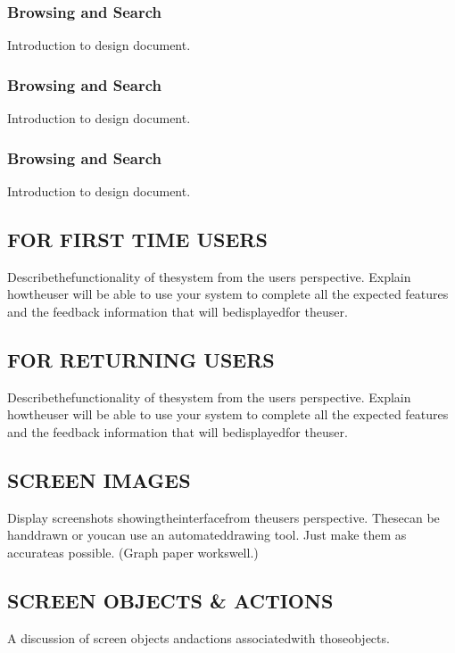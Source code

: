 \documentclass[twoside,letterpaper]{article}
\begin{document}
\subsubsection[Browsing and Search]{\rmfamily\bfseries\color{black}
Browsing and Search}
{\rmfamily\color{black}
Introduction to design document.
}

\subsubsection[Form Entry]{\rmfamily\bfseries\color{black}
Browsing and Search}
{\rmfamily\color{black}
Introduction to design document.
}

\subsubsection[Delayed Upload]{\rmfamily\bfseries\color{black}
Browsing and Search}
{\rmfamily\color{black}
Introduction to design document.
}

\subsection[FOR FIRST TIME USERS]{\rmfamily\bfseries\color{black}
FOR FIRST TIME USERS}
{\rmfamily\color{black}
Describethefunctionality of thesystem from the users perspective. Explain howtheuser
will be able to use your system to complete all the expected features and the feedback
information that will bedisplayedfor theuser.
}

\subsection[FOR RETURNING USERS]{\rmfamily\bfseries\color{black}
FOR RETURNING USERS}
{\rmfamily\color{black}
Describethefunctionality of thesystem from the users perspective. Explain howtheuser
will be able to use your system to complete all the expected features and the feedback
information that will bedisplayedfor theuser.
}

\subsection[SCREEN IMAGES]{\rmfamily\bfseries\color{black}
SCREEN IMAGES}
{\rmfamily\color{black}
Display screenshots showingtheinterfacefrom theusers perspective. Thesecan be handdrawn
or youcan use an automateddrawing tool. Just make them as accurateas possible.
(Graph paper workswell.)
}

\subsection[SCREEN OBJECTS \& ACTIONS]{\rmfamily\bfseries\color{black}
SCREEN OBJECTS \& ACTIONS}
{\rmfamily\color{black}
A discussion of screen objects andactions associatedwith thoseobjects.
}
\end{document}
